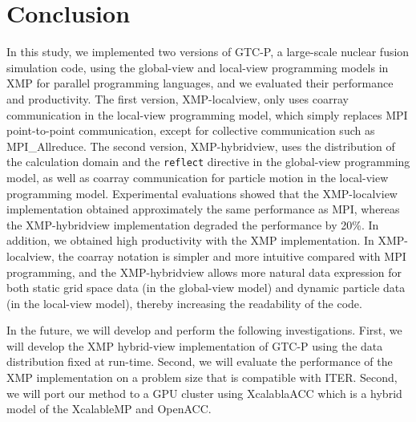\section{Conclusion\label{sec6}}
In this study, we implemented two versions of GTC-P, a large-scale nuclear fusion simulation code, using the global-view and local-view programming models in XMP for parallel programming languages, and we evaluated their performance and productivity. The first version, XMP-localview, only uses coarray communication in the local-view programming model, which simply replaces MPI point-to-point communication, except for collective communication such as MPI\_Allreduce. The second version, XMP-hybridview, uses the distribution of the calculation domain and the {\tt reflect} directive in the global-view programming model, as well as coarray communication for particle motion in the local-view programming model. Experimental evaluations showed that the XMP-localview implementation obtained approximately the same performance as MPI, whereas the XMP-hybridview implementation degraded the performance by 20\%. In addition, we obtained high productivity with the XMP implementation. In XMP-localview, the coarray notation is simpler and more intuitive compared with MPI programming, and the XMP-hybridview allows more natural data expression for both static grid space data (in the global-view model) and dynamic particle data (in the local-view model), thereby increasing the readability of the code.

In the future, we will develop and perform the following investigations. First, we will develop the XMP hybrid-view implementation of GTC-P using the data distribution fixed at run-time. Second, we will evaluate the performance of the XMP implementation on a problem size that is compatible with ITER. Second, we will port our method to a GPU cluster using XcalablaACC\cite{XACC} which is a hybrid model of the XcalableMP and OpenACC.

